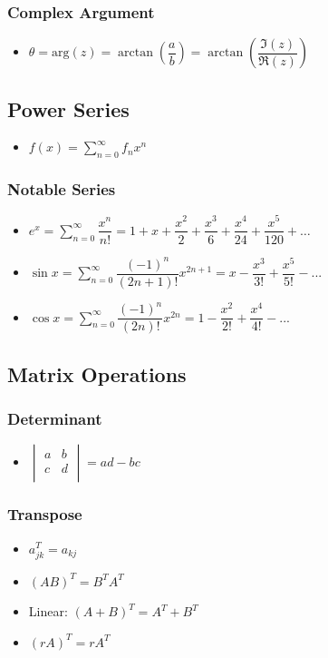 \documentclass[]{report}
\newcommand \tab[1][1cm]{\hspace*{#1}}
\newcommand{\itemt}{\item \tab}
\begin{document}
\subsubsection{Complex Argument}
\begin{itemize}
\itemt \( \theta = \mathrm{arg} (z) = \arctan(\dfrac{a}{b}) = \arctan(\dfrac{\Im(z)}{\Re(z)}) \)
\end{itemize}		

\subsection{Power Series}
\begin{itemize}
\itemt \( f(x) = \sum\limits_{n=0}^{\infty} f_n x^n \)
\end{itemize}

\subsubsection{Notable Series}			
\begin{itemize}
\itemt \( e^x = \sum\limits_{n=0}^{\infty} \dfrac{x^n}{n!} = 1 + x + \dfrac{x^2}{2} + \dfrac{x^3}{6} + \dfrac{x^4}{24} + \dfrac{x^5}{120} + \dots \)					
\itemt \( \sin x = \sum\limits_{n=0}^{\infty} \dfrac{(-1)^n}{(2n+1)!}x^{2n+1} = x - \dfrac{x^3}{3!} + \dfrac{x^5}{5!} -... \)					
\itemt \(\cos x = \sum\limits_{n=0}^{\infty} \dfrac{(-1)^n}{(2n)!}x^{2n} = 1 - \dfrac{x^2}{2!} + \dfrac{x^4}{4!} - ...\)
\end{itemize}

\subsection{Matrix Operations}

\subsubsection{Determinant}
\begin{itemize}
\itemt \(
\begin{vmatrix}
a	& b	\\
c	& d \\
\end{vmatrix}
= ad-bc
\)
\end{itemize}

\subsubsection{Transpose}			
\begin{itemize}
\itemt \( a^T_{jk} = a_{kj} \)
\itemt \( (AB)^T = B^T A^T \)
\itemt Linear: \( (A+B)^T = A^T+B^T \)
\itemt \( (rA)^T=rA^T \)
\end{itemize}		
\end{document}
